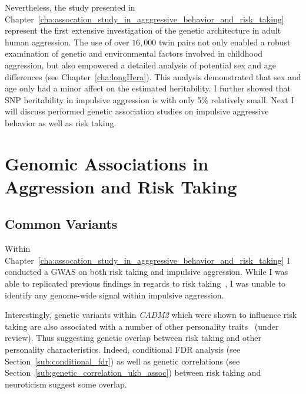 Nevertheless, the study presented in Chapter~\ref{cha:assocation_study_in_agggressive_behavior_and_risk_taking} represent the first extensive investigation of the genetic architecture in adult human aggression.
The use of over $16,000$ twin pairs not only enabled a robust examination of genetic and environmental factors involved in childhood aggression, but also empowered a detailed analysis of potential sex and age differences (see Chapter~\ref{cha:longHera}).
This analysis demonstrated that sex and age only had a minor affect on the estimated heritability.
I further showed that SNP heritability in impulsive aggression is with only 5\% relatively small.
Next I will discuss performed genetic association studies on impulsive aggressive behavior as well as risk taking. 

\section{Genomic Associations in Aggression and Risk Taking}
\label{sec:genomic_associations_in_aggression_and_risk_taking}

\subsection{Common Variants}
\label{sub:common_variants_discussion}

Within Chapter~\ref{cha:assocation_study_in_agggressive_behavior_and_risk_taking} I conducted a GWAS on both risk taking and impulsive aggression.
While I was able to replicated previous findings in regards to risk taking~\cite{Day2016}, I was unable to identify any genome-wide signal within impulsive aggression.

Interestingly, genetic variants within \textit{CADM2} which were shown to influence risk taking are also associated with a number of other personality traits~\cite{Boutwell2017} (under review).
Thus suggesting genetic overlap between risk taking and other personality characteristics.
Indeed, conditional FDR analysis (see Section~\ref{sub:conditional_fdr}) as well as genetic correlations (see Section~\ref{sub:genetic_correlation_ukb_assoc}) between risk taking and neuroticism suggest some overlap.


